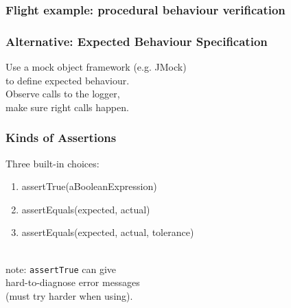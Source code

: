 \documentclass{beamer}
\newenvironment{changemargin}[1]{%
  \begin{list}{}{%
    \setlength{\topsep}{0pt}%
    \setlength{\leftmargin}{#1}%
    \setlength{\rightmargin}{1em}
    \setlength{\listparindent}{\parindent}%
    \setlength{\itemindent}{\parindent}%
    \setlength{\parsep}{\parskip}%
  }%
  \item[]}{\end{list}}
\begin{document}
\begin{frame}
  \frametitle{Flight example: procedural behaviour verification}

  \small
    
\end{frame}

\begin{frame}
  \frametitle{Alternative: Expected Behaviour Specification}
  \Large
  \begin{changemargin}{2cm}
    Use a mock object framework (e.g. JMock)\\
    to define expected behaviour.\\[1em]

    Observe calls to the logger, \\
    make sure right calls happen.
  \end{changemargin}
\end{frame}

\begin{frame}
  \frametitle{Kinds of Assertions}
  \large
  \begin{changemargin}{2cm}
    Three built-in choices:
    \begin{enumerate}
    \item assertTrue(aBooleanExpression)
    \item assertEquals(expected, actual)
    \item assertEquals(expected, actual, tolerance)
    \end{enumerate}
    ~\\[1em]
    note: {\tt assertTrue} can give \\
    hard-to-diagnose error messages \\
    (must try harder when using).
  \end{changemargin}
\end{frame}
\end{document}
